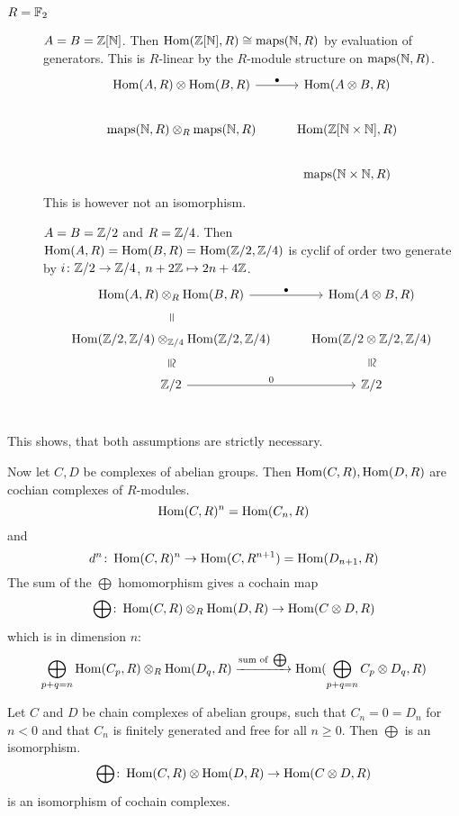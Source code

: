 \documentclass[language=english]{TemplateLecture}
\begin{document}
\begin{example}
    \begin{description}
        \item[\(R = \mathbb{F}_2\)] \(A = B= \mathbb{Z}[\mathbb{N}]\). Then \(\operatorname{Hom}(\mathbb{Z}[\mathbb{N}], R) \cong \mathrm{maps}(\mathbb{N}, R)\) by evaluation of generators. This is \(R\)-linear by the \(R\)-module structure on \(\mathrm{maps}(\mathbb{N}, R)\).
        \[\begin{tikzcd}
            \Hom(A,R) \otimes \Hom(B,R) \ar[r, "\bullet"] & \Hom(A\otimes B, R) \\
            \mathrm{maps}(\IN,R) \otimes_R \mathrm{maps}(\IN, R) & \Hom(\IZ[\IN \times \IN], R) \\
            & \mathrm{maps}(\IN \times \IN, R)
        \end{tikzcd}\]
        This is however not an isomorphism.

        \item[] \(A = B = \mathbb{Z}/2\) and \(R = \mathbb{Z}/4\). Then \(\operatorname{Hom}(A,R) = \operatorname{Hom}(B,R) = \operatorname{Hom}(\mathbb{Z}/2, \mathbb{Z}/4)\) is cyclif of order two generate by \(i \colon \mathbb{Z}/2 \to \mathbb{Z}/4\), \(n +2\mathbb{Z} \mapsto 2n + 4\mathbb{Z}\).
        \[\begin{tikzcd}
            \Hom(A,R) \otimes_R \Hom(B,R) \ar[r, "\bullet"] \ar[d, phantom, sloped, "="] & \Hom(A\otimes B, R) \\
            \Hom(\IZ/2, \IZ/4) \otimes_{\IZ/4} \Hom(\IZ/2, \IZ/4) \ar[d, phantom, sloped, "\cong"] & \Hom(\IZ/2 \otimes \IZ/2, \IZ/4) \ar[d, phantom, sloped, "\cong"]\\
            \IZ/2 \ar[r, "0"] & \IZ/2 \\
        \end{tikzcd}\]
    \end{description}
\end{example}

This shows, that both assumptions are strictly necessary.

Now let \(C,D\) be complexes of abelian groups. Then \(\operatorname{Hom}(C,R), \operatorname{Hom}(D,R)\) are cochian complexes of \(R\)-modules.
\[\operatorname{Hom}(C,R)^n = \operatorname{Hom}(C_n,R)\]
and
\[d^n \colon \operatorname{Hom}(C,R)^n \to \operatorname{Hom}(C,R^{n+1}) = \operatorname{Hom}(D_{n+1}, R)\]
The sum of the \(\bigoplus\) homomorphism gives a cochain map
\[\bigoplus \colon \operatorname{Hom}(C,R) \otimes_R \operatorname{Hom}(D,R) \to \operatorname{Hom}(C\otimes D, R)\]
which is in dimension \(n\):
\[\bigoplus_{p+q = n} \operatorname{Hom}(C_p,R) \otimes_R \operatorname{Hom}(D_q, R) \xrightarrow{\text{sum of } \bigoplus} \operatorname{Hom}(\bigoplus_{p+q = n} C_p \otimes D_q, R)\]

\begin{proposition}
    Let \(C\) and \(D\) be chain complexes of abelian groups, such that \(C_n = 0 = D_n\) for \(n < 0\) and that \(C_n\) is finitely generated and free for all \(n \geq 0\). Then \(\bigoplus\) is an isomorphism.
    \[\bigoplus\colon \operatorname{Hom}(C,R) \otimes \operatorname{Hom}(D,R) \to \operatorname{Hom}(C\otimes D, R)\]
    is an isomorphism of cochain complexes.
\end{proposition}
\end{document}
